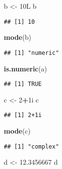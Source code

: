 \documentclass[
]{article}
\newenvironment{Shaded}{\begin{snugshade}}{\end{snugshade}}
\newcommand{\DecValTok}[1]{\textcolor[rgb]{0.00,0.00,0.81}{#1}}
\newcommand{\FloatTok}[1]{\textcolor[rgb]{0.00,0.00,0.81}{#1}}
\newcommand{\FunctionTok}[1]{\textcolor[rgb]{0.13,0.29,0.53}{\textbf{#1}}}
\newcommand{\NormalTok}[1]{#1}
\newcommand{\OtherTok}[1]{\textcolor[rgb]{0.56,0.35,0.01}{#1}}
\newcommand{\SpecialCharTok}[1]{\textcolor[rgb]{0.81,0.36,0.00}{\textbf{#1}}}
\begin{document}
\begin{Shaded}
\begin{Highlighting}[]
\NormalTok{b }\OtherTok{\textless{}{-}}\NormalTok{ 10L}
\NormalTok{b }
\end{Highlighting}
\end{Shaded}

\begin{verbatim}
## [1] 10
\end{verbatim}

\begin{Shaded}
\begin{Highlighting}[]
\FunctionTok{mode}\NormalTok{(b)}
\end{Highlighting}
\end{Shaded}

\begin{verbatim}
## [1] "numeric"
\end{verbatim}

\begin{Shaded}
\begin{Highlighting}[]
\FunctionTok{is.numeric}\NormalTok{(a)}
\end{Highlighting}
\end{Shaded}

\begin{verbatim}
## [1] TRUE
\end{verbatim}

\begin{Shaded}
\begin{Highlighting}[]
\NormalTok{c }\OtherTok{\textless{}{-}} \DecValTok{2}\SpecialCharTok{+}\NormalTok{1i}
\NormalTok{c}
\end{Highlighting}
\end{Shaded}

\begin{verbatim}
## [1] 2+1i
\end{verbatim}

\begin{Shaded}
\begin{Highlighting}[]
\FunctionTok{mode}\NormalTok{(c)}
\end{Highlighting}
\end{Shaded}

\begin{verbatim}
## [1] "complex"
\end{verbatim}

\begin{Shaded}
\begin{Highlighting}[]
\NormalTok{d }\OtherTok{\textless{}{-}} \FloatTok{12.3456667}
\NormalTok{d}
\end{Highlighting}
\end{Shaded}
\end{document}
